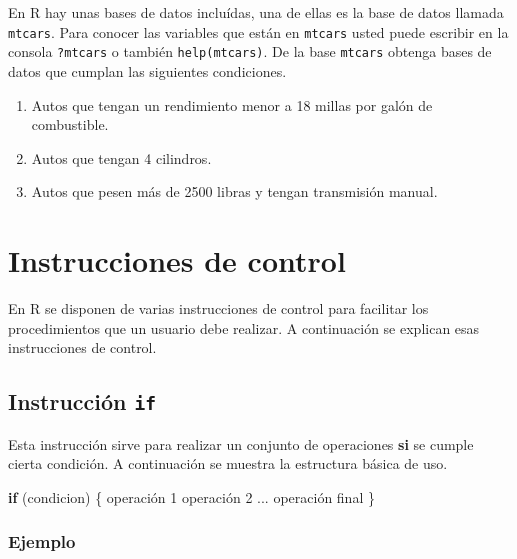 \documentclass[10pt,]{krantz}
\makeatletter
\newenvironment{Shaded}{\begin{snugshade}}{\end{snugshade}}
\newcommand{\DecValTok}[1]{\textcolor[rgb]{0.00,0.00,0.81}{#1}}
\newcommand{\ControlFlowTok}[1]{\textcolor[rgb]{0.13,0.29,0.53}{\textbf{#1}}}
\newcommand{\NormalTok}[1]{#1}
\providecommand{\tightlist}{%
  \setlength{\itemsep}{0pt}\setlength{\parskip}{0pt}}
\let\proglang=\textsf
\newenvironment{kframe}{%
\medskip{}
\setlength{\fboxsep}{.8em}
 \def\at@end@of@kframe{}%
 \ifinner\ifhmode%
  \def\at@end@of@kframe{\end{minipage}}%
  \begin{minipage}{\columnwidth}%
 \fi\fi%
 \def\FrameCommand##1{\hskip\@totalleftmargin \hskip-\fboxsep
 \colorbox{shadecolor}{##1}\hskip-\fboxsep
     \hskip-\linewidth \hskip-\@totalleftmargin \hskip\columnwidth}%
 \MakeFramed {\advance\hsize-\width
   \@totalleftmargin\z@ \linewidth\hsize
   \@setminipage}}%
 {\par\unskip\endMakeFramed%
 \at@end@of@kframe}
\renewenvironment{Shaded}{\begin{kframe}}{\end{kframe}}
\makeatother
\begin{document}
En \proglang{R} hay unas bases de datos incluídas, una de ellas es la
base de datos llamada \texttt{mtcars}. Para conocer las variables que
están en \texttt{mtcars} usted puede escribir en la consola
\texttt{?mtcars} o también \texttt{help(mtcars)}. De la base
\texttt{mtcars} obtenga bases de datos que cumplan las siguientes
condiciones.

\begin{enumerate}
\def\labelenumi{\arabic{enumi}.}
\setcounter{enumi}{21}
\tightlist
\item
  Autos que tengan un rendimiento menor a 18 millas por galón de
  combustible.
\item
  Autos que tengan 4 cilindros.
\item
  Autos que pesen más de 2500 libras y tengan transmisión manual.
\end{enumerate}

\chapter{\texorpdfstring{Instrucciones de control
\label{bucles}}{Instrucciones de control }}\label{instrucciones-de-control}

En \proglang{R} se disponen de varias instrucciones de control para
facilitar los procedimientos que un usuario debe realizar. A
continuación se explican esas instrucciones de control.

\section{\texorpdfstring{Instrucción \texttt{if}
}{Instrucción if }}\label{instruccion-if}

Esta instrucción sirve para realizar un conjunto de operaciones
\textbf{si} se cumple cierta condición. A continuación se muestra la
estructura básica de uso.

\begin{Shaded}
\begin{Highlighting}[]
\ControlFlowTok{if}\NormalTok{ (condicion) \{}
\NormalTok{  operación }\DecValTok{1}
\NormalTok{  operación }\DecValTok{2}
\NormalTok{  ...}
\NormalTok{  operación final}
\NormalTok{\}}
\end{Highlighting}
\end{Shaded}

\subsection*{Ejemplo}\label{ejemplo-15}
\end{document}

